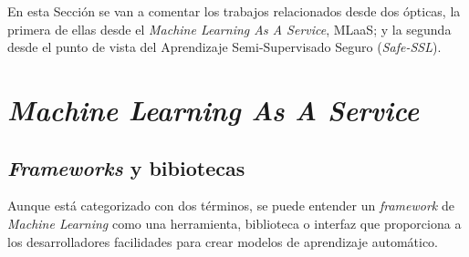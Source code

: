 
En esta Sección se van a comentar los trabajos relacionados desde dos ópticas, la primera de ellas desde el \textit{Machine Learning As A Service}, MLaaS; y la segunda desde el punto de vista del Aprendizaje Semi-Supervisado Seguro (\textit{Safe-SSL}).

\section{\textit{Machine Learning As A Service}}
\subsection{\textit{Frameworks} y bibiotecas}\label{related:frameworks}
Aunque está categorizado con dos términos, se puede entender un \textit{framework} de \textit{Machine Learning} como una herramienta, biblioteca o interfaz que proporciona a los desarrolladores facilidades para crear modelos de aprendizaje automático.

